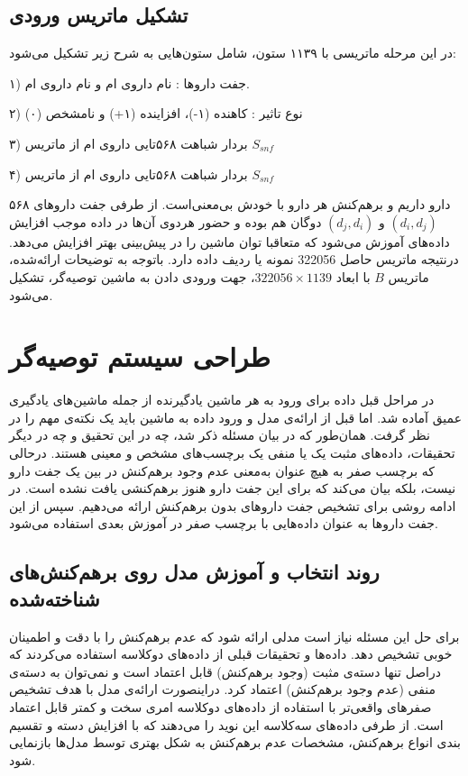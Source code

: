 \subsection{تشکیل ماتریس ورودی}

در این مرحله ماتریسی با ۱۱۳۹ ستون، شامل ستون‌هایی به شرح زیر تشکیل می‌شود:

۱) جفت داروها : نام داروی
ام و نام داروی
ام.

۲) نوع تاثیر : کاهنده (۱-)، افزاینده (۱+) و نامشخص (۰)

۳) بردار شباهت ۵۶۸تایی داروی
ام از ماتریس
$S_{snf}$

۴) بردار شباهت ۵۶۸تایی داروی
ام از ماتریس
$S_{snf}$

۵۶۸ دارو داریم و برهم‌کنش هر دارو با خودش بی‌معنی‌است. از طرفی جفت داروهای 
$(d_i, d_j)$
و 
$(d_j, d_i)$
دوگان هم بوده و حضور هردوی آن‌ها در داده موجب افزایش داده‌های آموزش می‌شود که متعاقبا توان ماشین را در پیش‌بینی بهتر افزایش می‌دهد. درنتیجه ماتریس حاصل 322056 نمونه یا ردیف داده دارد. باتوجه به توضیحات ارائه‌شده، ماتریس 
$B$
با ابعاد 
$322056 \times 1139$،
جهت ورودی دادن به ماشین توصیه‌گر، تشکیل می‌شود.


\section{
طراحی سیستم توصیه‌گر
\label{RecomDesign}}

در مراحل قبل داده برای ورود به هر ماشین یادگیرنده از جمله ماشین‌های یادگیری عمیق آماده شد. اما قبل از ارائه‌ی مدل و ورود داده به ماشین باید یک نکته‌ی مهم را در نظر گرفت. همان‌طور که در بیان مسئله ذکر شد، چه در این تحقیق و چه در دیگر تحقیقات، داده‌های مثبت یک یا منفی یک برچسب‌های مشخص و معینی هستند. درحالی که برچسب صفر به هیچ عنوان به‌معنی عدم وجود برهم‌کنش در بین یک جفت دارو نیست، بلکه بیان می‌کند که برای این جفت دارو هنوز برهم‌کنشی یافت نشده ‌است. در ادامه روشی برای تشخیص جفت داروهای بدون برهم‌کنش ارائه می‌دهیم. سپس از این جفت داروها به عنوان داده‌هایی با برچسب صفر در آموزش بعدی استفاده می‌شود.

\subsection{روند انتخاب و آموزش مدل روی برهم‌کنش‌های شناخته‌شده}

برای حل این مسئله نیاز است مدلی ارائه شود که عدم برهم‌کنش را با دقت و اطمینان خوبی تشخیص دهد. داده‌ها و تحقیقات قبلی از داده‌های دوکلاسه استفاده می‌کردند که دراصل تنها دسته‌ی مثبت (وجود برهم‌کنش) قابل اعتماد است و نمی‌توان به دسته‌ی منفی (عدم وجود برهم‌کنش) اعتماد کرد. دراینصورت ارائه‌ی مدل با هدف تشخیص صفرهای واقعی‌تر با استفاده از داده‌های دوکلاسه امری سخت و کمتر قابل اعتماد است. از طرفی داده‌های سه‌کلاسه این نوید را می‌دهند که با افزایش دسته‌ و تقسیم بندی انواع برهم‌کنش، مشخصات عدم بر‌هم‌کنش به شکل بهتری توسط مدل‌ها بازنمایی شود.

